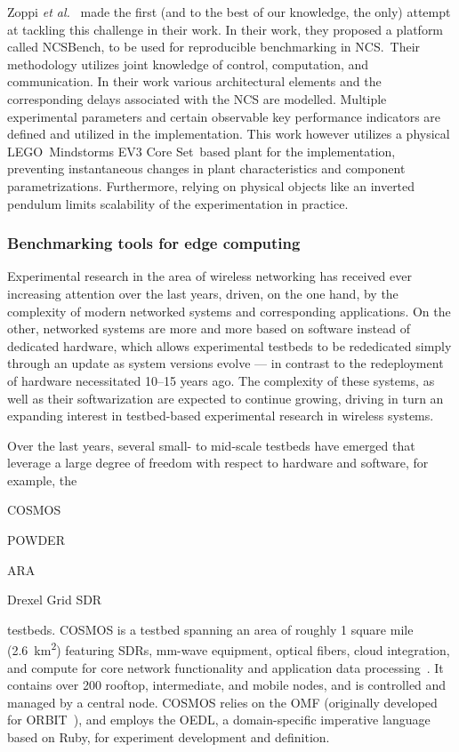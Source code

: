 Zoppi \emph{et al.}~\cite{Zoppi2020NCSBench} made the first (and to the best of our knowledge, the only) attempt at tackling this challenge in their work.
In their work, they proposed a platform called NCSBench, to be used for reproducible benchmarking in NCS.\
Their methodology utilizes joint knowledge of control, computation, and communication.
In their work various architectural elements and the corresponding delays associated with the NCS are modelled.
Multiple experimental parameters and certain observable key performance indicators are defined and utilized in the implementation.
This work however utilizes a physical LEGO\textregistered{}\ Mindstorms EV3 Core Set\texttrademark{}\  based plant for the implementation, preventing instantaneous changes in plant characteristics and component parametrizations.
Furthermore, relying on physical objects like an inverted pendulum limits scalability of the experimentation in practice.

\subsubsection{Benchmarking tools for edge computing}

Experimental research in the area of wireless networking has received ever increasing attention over the last years, driven, on the one hand, by the complexity of modern networked systems and corresponding applications.
On the other, networked systems are more and more based on software instead of dedicated hardware, which allows experimental testbeds to be rededicated simply through an update as system versions evolve --- in contrast to the redeployment of hardware necessitated \numrange[range-phrase={--}]{10}{15} years ago.
The complexity of these systems, as well as their softwarization are expected to continue growing, driving in turn an expanding interest in testbed-based experimental research in wireless systems.

Over the last years, several small- to mid-scale testbeds have emerged that leverage a large degree of freedom with respect to hardware and software, for example, the
\begin{enumerate*}[itemjoin={{, }}, itemjoin*={{, and }}]
    \item \gls{COSMOS}
    \item \gls{POWDER}
    \item \gls{ARA}
    \item Drexel Grid \gls{SDR}
\end{enumerate*} testbeds.
\gls{COSMOS} is a testbed spanning an area of roughly \num{1} square mile (\SI{2.6}{\kilo\meter\squared}) featuring \glspl{SDR}, \si{\milli\meter}-wave equipment, optical fibers, cloud integration, and compute for core network functionality and application data processing~\cite{Cosmos1,cosmos2}.
It contains over \num{200} rooftop, intermediate, and mobile nodes, and is controlled and managed by a central node.
\gls{COSMOS} relies on the \gls{OMF} (originally developed for ORBIT~\cite{orbit}), and employs the \gls{OEDL}, a domain-specific imperative language based on Ruby, for experiment development and definition.

